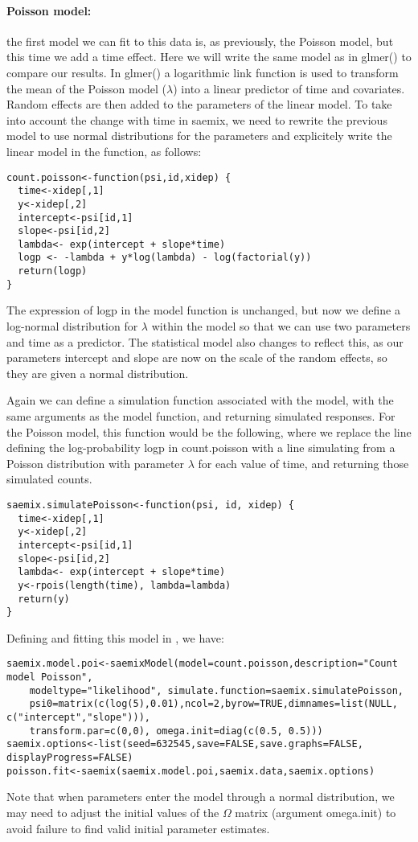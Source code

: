 \paragraph{Poisson model:} the first model we can fit to this data is, as previously, the Poisson model, but this time we add a time effect. Here we will write the same model as in {\sf glmer()} to compare our results. In {\sf glmer()} a logarithmic link function is used to transform the mean of the Poisson model ($\lambda$) into a linear predictor of time and covariates. Random effects are then added to the parameters of the linear model. To take into account the change with time in {\sf saemix}, we need to rewrite the previous model to use normal distributions for the parameters and explicitely write the linear model in the function, as follows:
\begin{verbatim}
count.poisson<-function(psi,id,xidep) { 
  time<-xidep[,1]
  y<-xidep[,2]
  intercept<-psi[id,1]
  slope<-psi[id,2]
  lambda<- exp(intercept + slope*time)
  logp <- -lambda + y*log(lambda) - log(factorial(y))
  return(logp)
}
\end{verbatim}
The expression of logp in the model function is unchanged, but now we define a log-normal distribution for $\lambda$ within the model so that we can use two parameters and time as a predictor. The statistical model also changes to reflect this, as our parameters intercept and slope are now on the scale of the random effects, so they are given a normal distribution. 

Again we can define a simulation function associated with the model, with the same arguments as the model function, and returning simulated responses. For the Poisson model, this function would be the following, where we replace the line defining the log-probability {\sf logp} in {\sf count.poisson} with a line simulating from a Poisson distribution with parameter $\lambda$ for each value of time, and returning those simulated counts.
\begin{verbatim}
saemix.simulatePoisson<-function(psi, id, xidep) {
  time<-xidep[,1]
  y<-xidep[,2]
  intercept<-psi[id,1]
  slope<-psi[id,2]
  lambda<- exp(intercept + slope*time)
  y<-rpois(length(time), lambda=lambda)
  return(y)
}
\end{verbatim}

Defining and fitting this model in \saemix, we have:
\begin{verbatim}
saemix.model.poi<-saemixModel(model=count.poisson,description="Count model Poisson",
    modeltype="likelihood", simulate.function=saemix.simulatePoisson,
    psi0=matrix(c(log(5),0.01),ncol=2,byrow=TRUE,dimnames=list(NULL, c("intercept","slope"))), 
    transform.par=c(0,0), omega.init=diag(c(0.5, 0.5)))
saemix.options<-list(seed=632545,save=FALSE,save.graphs=FALSE, displayProgress=FALSE)
poisson.fit<-saemix(saemix.model.poi,saemix.data,saemix.options)
\end{verbatim}
Note that when parameters enter the model through a normal distribution, we may need to adjust the initial values of the $\Omega$ matrix (argument {\sf omega.init}) to avoid failure to find valid initial parameter estimates.

